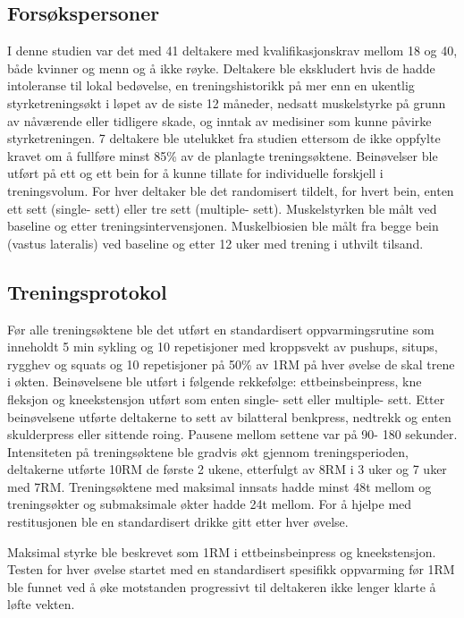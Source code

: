 \documentclass[
]{book}
\begin{document}
\hypertarget{forsuxf8kspersoner}{%
\subsection{Forsøkspersoner}\label{forsuxf8kspersoner}}

I denne studien var det med 41 deltakere med kvalifikasjonskrav mellom 18 og 40, både kvinner og menn og å ikke røyke. Deltakere ble ekskludert hvis de hadde intoleranse til lokal bedøvelse, en treningshistorikk på mer enn en ukentlig styrketreningsøkt i løpet av de siste 12 måneder, nedsatt muskelstyrke på grunn av nåværende eller tidligere skade, og inntak av medisiner som kunne påvirke styrketreningen. 7 deltakere ble utelukket fra studien ettersom de ikke oppfylte kravet om å fullføre minst 85\% av de planlagte treningsøktene. Beinøvelser ble utført på ett og ett bein for å kunne tillate for individuelle forskjell i treningsvolum. For hver deltaker ble det randomisert tildelt, for hvert bein, enten ett sett (single- sett) eller tre sett (multiple- sett). Muskelstyrken ble målt ved baseline og etter treningsintervensjonen. Muskelbiosien ble målt fra begge bein (vastus lateralis) ved baseline og etter 12 uker med trening i uthvilt tilsand.

\hypertarget{treningsprotokol}{%
\subsection{Treningsprotokol}\label{treningsprotokol}}

Før alle treningsøktene ble det utført en standardisert oppvarmingsrutine som inneholdt 5 min sykling og 10 repetisjoner med kroppsvekt av pushups, situps, rygghev og squats og 10 repetisjoner på 50\% av 1RM på hver øvelse de skal trene i økten. Beinøvelsene ble utført i følgende rekkefølge: ettbeinsbeinpress, kne fleksjon og kneekstensjon utført som enten single- sett eller multiple- sett. Etter beinøvelsene utførte deltakerne to sett av bilatteral benkpress, nedtrekk og enten skulderpress eller sittende roing. Pausene mellom settene var på 90- 180 sekunder. Intensiteten på treningsøktene ble gradvis økt gjennom treningsperioden, deltakerne utførte 10RM de første 2 ukene, etterfulgt av 8RM i 3 uker og 7 uker med 7RM. Treningsøktene med maksimal innsats hadde minst 48t mellom og treningsøkter og submaksimale økter hadde 24t mellom. For å hjelpe med restitusjonen ble en standardisert drikke gitt etter hver øvelse.

Maksimal styrke ble beskrevet som 1RM i ettbeinsbeinpress og kneekstensjon. Testen for hver øvelse startet med en standardisert spesifikk oppvarming før 1RM ble funnet ved å øke motstanden progressivt til deltakeren ikke lenger klarte å løfte vekten.
\end{document}
